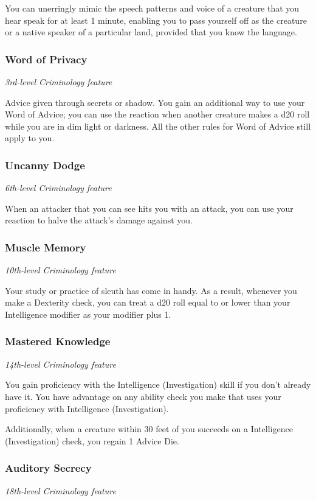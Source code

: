 \documentclass[letterpaper,openany,twoside,twocolumn]{book}
\begin{document}
	You can unerringly mimic the speech patterns and voice of a creature that you hear speak for at least 1 minute, enabling you to pass yourself off as the creature or a native speaker of a particular land, provided that you know the language.
	
	\subsubsection*{Word of Privacy}
	\textnormal{\textit{3rd-level Criminology feature}}
	
	Advice given through secrets or shadow. You gain an additional way to use your Word of Advice; you can use the reaction when another creature makes a d20 roll while you are in dim light or darkness. All the other rules for Word of Advice still apply to you.
	
	\subsubsection*{Uncanny Dodge}
	\textnormal{\textit{6th-level Criminology feature}}
	
	When an attacker that you can see hits you with an attack, you can use your reaction to halve the attack’s damage against you.
	
	\subsubsection*{Muscle Memory}
	\textnormal{\textit{10th-level Criminology feature}}
	
	Your study or practice of sleuth has come in handy. As a result, whenever you make a Dexterity check, you can treat a d20 roll equal to or lower than your Intelligence modifier as your modifier plus 1.
	
	\subsubsection*{Mastered Knowledge}
	\textnormal{\textit{14th-level Criminology feature}}
	
	You gain proficiency with the Intelligence (Investigation) skill if you don't already have it. You have advantage on any ability check you make that uses your proficiency with Intelligence (Investigation).
	
	Additionally, when a creature within 30 feet of you succeeds on a Intelligence (Investigation) check, you regain 1 Advice Die.
	
	\subsubsection*{Auditory Secrecy}
	\textnormal{\textit{18th-level Criminology feature}}
	
\end{document}

